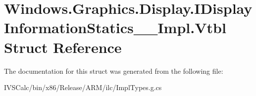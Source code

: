 \hypertarget{struct_windows_1_1_graphics_1_1_display_1_1_i_display_information_statics_____impl_1_1_vtbl}{}\section{Windows.\+Graphics.\+Display.\+I\+Display\+Information\+Statics\+\_\+\+\_\+\+Impl.\+Vtbl Struct Reference}
\label{struct_windows_1_1_graphics_1_1_display_1_1_i_display_information_statics_____impl_1_1_vtbl}


The documentation for this struct was generated from the following file\+:\begin{DoxyCompactItemize}
\item 
I\+V\+S\+Calc/bin/x86/\+Release/\+A\+R\+M/ilc/Impl\+Types.\+g.\+cs\end{DoxyCompactItemize}
